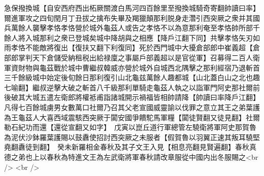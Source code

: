 急保撥換城【自安西府西出柘厥關渡白馬河四百餘里至撥換城騎奇寄翻帥讀曰率】　爾進軍攻之四旬閏月丁丑拔之擒布失畢及羯獵顛那利脱身走濳引西突厥之衆并其國兵萬餘人襲擊孝恪孝恪營於城外龜茲人或告之孝恪不以為意那利奄至孝恪帥所部千餘人將入城那利之衆已登城矣城中降胡與之相應【降戶江翻下同】共擊孝恪矢刃如雨孝恪不能敵將復出【復扶又翻下利復同】死於西門城中大擾倉部郎中崔義超【倉部郎掌判天下倉儲受納租税出給禄廩之事屬戶部義超以是官從軍】召募得二百人衛軍資財物與龜茲戰於城中曹繼叔韓威亦營於城外自城西北隅擊之那利經宿乃退斬首三千餘級城中始定後旬餘日那利復引山北龜兹萬餘人趣都城【山北蓋白山之北也趣七喻翻】繼叔逆擊大破之斬首八千級那利單騎走龜茲人執之以詣軍門阿史那社爾前後破其大城五遣左衛郎將權袛甫詣諸城開示禍福皆相帥請降【帥讀曰率降戶江翻】凡得七百餘城虜男女數萬口社爾乃召其父老宣國威靈諭以伐罪之意立其王之弟葉護為王龜茲人大喜西域震駭西突厥于闐安國爭饋駝馬軍糧【闐徒賢翻又徒見翻】社爾勒石紀功而還【還從宣翻又如字】　戊寅以崑丘道行軍總管左驍衛將軍阿史那賀魯為泥伏沙鉢羅葉護賜以鼓纛使招討西突厥之未服者【假賀魯以羽翼正速其叛耳驍堅堯翻纛徒到翻】　癸未新羅相金春秋及其子文王入見【相息亮翻見賢遍翻】春秋真德之弟也上以春秋為特進文王為左武衛將軍春秋請改章服從中國内出冬服賜之<br />
<br />
